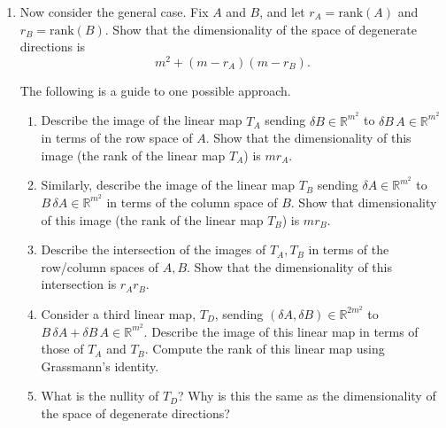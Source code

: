 \documentclass[11pt]{article}
\newcommand{\R}{\mathbb{R}}
\newcommand{\rank}{\mathrm{rank}}
\begin{document}
\begin{exercise}
\begin{enumerate}
    \item
        \label{ex:dln-degeneracy:general-rank}
        Now consider the general case. Fix $A$ and $B$, and let $r_A = \rank(A)$ and $r_B = \rank(B)$. Show that the dimensionality of the space of degenerate directions is
        $$
            m^2 + (m-r_A)(m-r_B).
        $$
        \begin{hint}
The following is a guide to one possible approach.
        \begin{enumerate}
            \item
                Describe the image of the linear map $T_A$
                sending
                    $\delta\!B \in \R^{m^2}$
                to
                    $\delta\!B\, A \in \R^{m^2}$
                in terms of the row space of $A$.
                Show that the dimensionality of this image (the rank of the linear map $T_A$) is $m r_A$.
            \item 
                Similarly, describe the image of the linear map $T_B$
                sending
                    $\delta\!A \in \R^{m^2}$
                to
                    $B\, \delta\!A \in \R^{m^2}$
                in terms of the column space of $B$.
                Show that dimensionality of this image (the rank of the linear map $T_B$) is $m r_B$.
            \item 
                Describe the intersection of the images of $T_A, T_B$ in terms of the row/column spaces of $A, B$. Show that the dimensionality of this intersection is $r_A r_B$.
            \item
                Consider a third linear map, $T_D$,
                sending
                    $(\delta\!A, \delta\!B) \in \R^{2m^2}$
                to 
                    $B\,\delta\!A + \delta\!B\, A \in \R^{m^2}$.
                Describe the image of this linear map in terms of those of $T_A$ and $T_B$.
                Compute the rank of this linear map using Grassmann's identity.
            \item 
                What is the nullity of $T_D$? Why is this the same as the dimensionality of the space of degenerate directions?
        \end{enumerate}
    \end{hint}
\end{enumerate}
\end{exercise}
\end{document}

